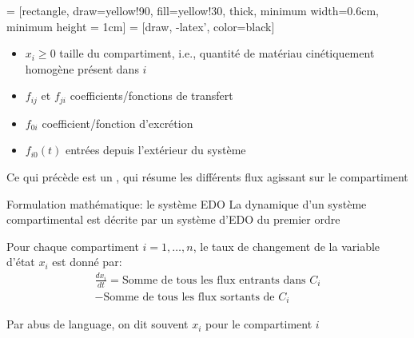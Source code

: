 \documentclass[aspectratio=169]{beamer}\usepackage[]{graphicx}\usepackage[]{xcolor}
\begin{document}
\begin{frame}{}
  \begin{minipage}{0.4\textwidth}
     = [rectangle, 
    draw=yellow!90, 
    fill=yellow!30, 
    thick, 
    minimum width=0.6cm,
    minimum height = 1cm]
     = [draw, 
    -latex', 
    color=black]
  \end{minipage}
  \begin{minipage}{0.55\textwidth}
    \begin{itemize}
      \item $x_i\geq 0$ taille du compartiment, i.e., quantité de matériau cinétiquement homogène présent dans $i$
      \item $f_{ij}$ et $f_{ji}$ coefficients/fonctions de transfert
      \item $f_{0i}$ coefficient/fonction d'excrétion
      \item $f_{i0}(t)$ entrées depuis l'extérieur du système
    \end{itemize}
  \end{minipage}
  \vfill
  Ce qui précède est un , qui résume les différents flux agissant sur le compartiment
\end{frame}

\begin{frame}{Formulation mathématique: le système EDO}
    La dynamique d'un système compartimental est décrite par un système d'EDO du premier ordre

    \begin{definition}
        Pour chaque compartiment $i=1,\ldots,n$, le taux de changement de la variable d'état $x_i$ est donné par:
        \begin{multline*}
          \frac{dx_i}{dt} = \text{Somme de tous les flux entrants dans } C_i \\
          - \text{Somme de tous les flux sortants de } C_i
        \end{multline*}
    \end{definition}
    \vfill
    Par abus de language, on dit souvent $x_i$ pour le compartiment $i$
\end{frame}
\end{document}
